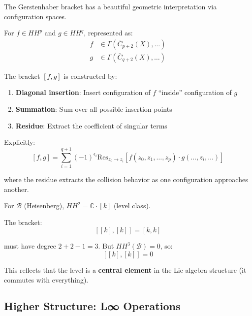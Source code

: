 \begin{construction}\label{const:gerstenhaber-bracket}
The Gerstenhaber bracket has a beautiful geometric interpretation via configuration spaces.

For $f \in HH^p$ and $g \in HH^q$, represented as:
\begin{align*}
f &\in \Gamma(\overline{C}_{p+2}(X), \ldots)\\
g &\in \Gamma(\overline{C}_{q+2}(X), \ldots)
\end{align*}

The bracket $[f, g]$ is constructed by:
\begin{enumerate}
\item \textbf{Diagonal insertion}: Insert configuration of $f$ ``inside'' configuration of $g$
\item \textbf{Summation}: Sum over all possible insertion points
\item \textbf{Residue}: Extract the coefficient of singular terms
\end{enumerate}

Explicitly:
$$[f, g] = \sum_{i=1}^{q+1} (-1)^{\epsilon_i} \text{Res}_{z_0 \to z_i}\left[f(z_0, z_1, \ldots, z_p) 
\cdot g(\ldots, z_i, \ldots)\right]$$

where the residue extracts the collision behavior as one configuration approaches another.
\end{construction}

\begin{example}\label{ex:gerstenhaber-heisenberg}
For $\mathcal{B}$ (Heisenberg), $HH^2 = \mathbb{C} \cdot [k]$ (level class).

The bracket:
$$[[k], [k]] = [k, k]$$

must have degree $2 + 2 - 1 = 3$. But $HH^3(\mathcal{B}) = 0$, so:
$$[[k], [k]] = 0$$

This reflects that the level is a \textbf{central element} in the Lie algebra structure
(it commutes with everything).
\end{example}

\subsection{Higher Structure: L∞ Operations}


